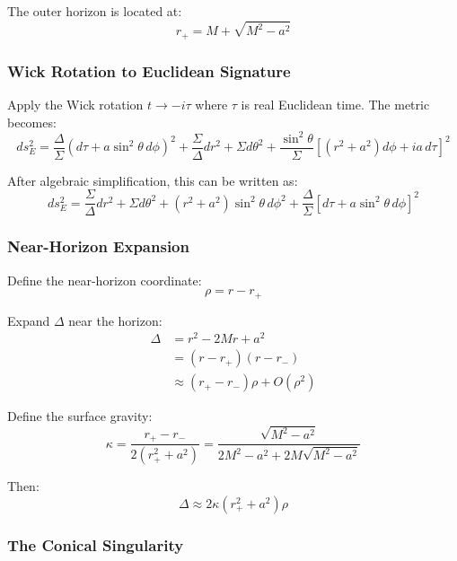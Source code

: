 \documentclass[11pt]{article}
\begin{document}
The outer horizon is located at:
\begin{equation}
r_+ = M + \sqrt{M^2 - a^2}
\end{equation}

\subsubsection{Wick Rotation to Euclidean Signature}

Apply the Wick rotation $t \to -i\tau$ where $\tau$ is real Euclidean time. The metric becomes:
\begin{equation}
ds^2_E = \frac{\Delta}{\Sigma}(d\tau + a\sin^2\theta\, d\phi)^2 + \frac{\Sigma}{\Delta}dr^2 + \Sigma d\theta^2 + \frac{\sin^2\theta}{\Sigma}[(r^2+a^2)d\phi + ia\,d\tau]^2
\end{equation}

After algebraic simplification, this can be written as:
\begin{equation}
ds^2_E = \frac{\Sigma}{\Delta}dr^2 + \Sigma d\theta^2 + (r^2+a^2)\sin^2\theta\, d\phi^2 + \frac{\Delta}{\Sigma}[d\tau + a\sin^2\theta\, d\phi]^2
\end{equation}

\subsubsection{Near-Horizon Expansion}

Define the near-horizon coordinate:
\begin{equation}
\rho = r - r_+
\end{equation}

Expand $\Delta$ near the horizon:
\begin{align}
\Delta &= r^2 - 2Mr + a^2 \\
&= (r - r_+)(r - r_-) \\
&\approx (r_+ - r_-)\rho + O(\rho^2)
\end{align}

Define the surface gravity:
\begin{equation}
\kappa = \frac{r_+ - r_-}{2(r_+^2 + a^2)} = \frac{\sqrt{M^2-a^2}}{2M^2 - a^2 + 2M\sqrt{M^2-a^2}}
\end{equation}

Then:
\begin{equation}
\Delta \approx 2\kappa(r_+^2 + a^2)\rho
\end{equation}

\subsubsection{The Conical Singularity}
\end{document}
